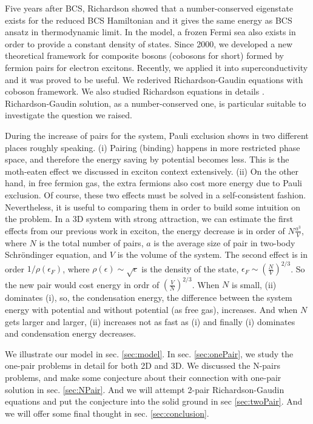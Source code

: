 \documentclass[3p,twocolumn]{elsarticle}
\begin{document}
Five years after BCS, Richardson showed that a number-conserved eigenstate exists for the reduced BCS Hamiltonian and it gives the same energy as BCS ansatz in thermodynamic limit\cite{Richardson1,Richardson2,Richardson3,Richardson1968,gaudin}.  In the model, a frozen Fermi sea also exists in order to provide a constant density of states.  Since 2000, we developed a new theoretical framework for composite bosons (cobosons for short) formed by fermion pairs for electron excitons\cite{CobosonPhysicsReports}.   Recently, we applied it into superconductivity and it was proved to be useful.  We rederived Richardson-Gaudin equations with coboson framework\cite{CobosonBcsRich}. We also studied Richardson equations in details \cite{CombescotCooper,combescotBCS}.  Richardson-Gaudin solution, as a number-conserved one, is  particular suitable to investigate the question we raised.  

During the increase of pairs for the system, Pauli exclusion shows in two different places roughly speaking.  (i) Pairing (binding) happens in more restricted phase space, and therefore the energy saving by potential becomes less.  This is the moth-eaten effect we discussed in exciton context extensively\cite{CobosonPhysicsReports}.  (ii) On the other hand, in free fermion gas, the extra fermions also cost more energy due to Pauli exclusion.  Of course, these two effects must be solved in a self-consistent fashion.  Nevertheless, it is useful to comparing them in order to build some intuition on the problem.  In a 3D system with strong attraction, we can estimate the first effects from our previous work in exciton, the energy decrease is in order of $N\frac{a^3}{V}$, where $N$ is the total number of pairs, $a$ is the average size of pair in two-body Schr\"{o}ndinger equation, and $V$ is the volume of the system. The second effect is in order $1/\rho(\epsilon_F)$, where $\rho(\epsilon)\sim\sqrt{\epsilon}$ is the density of the state, $\epsilon_F\sim\left(\frac{N}{V}\right)^{2/3}$. So the new pair would cost energy in ordr of $\left(\frac{V}{N}\right)^{2/3}$. When $N$ is small, (ii) dominates (i), so, the condensation energy, the difference between the system energy with potential and without potential (as free gas), increases.  And when $N$ gets larger and larger, (ii) increases not as fast as (i) and finally (i) dominates and condensation energy decreases. 

We illustrate our model in sec. \ref{sec:model}.  In sec. \ref{sec:onePair}, we study the one-pair problems in detail for both 2D and 3D.  We discussed the N-pairs problems, and make some conjecture about their connection with one-pair solution  in sec. \ref{sec:NPair}.  And we will attempt 2-pair Richardson-Gaudin equations and put the conjecture into the solid ground in sec \ref{sec:twoPair}.  And we will offer some final thought in sec. \ref{sec:conclusion}.
\end{document}
